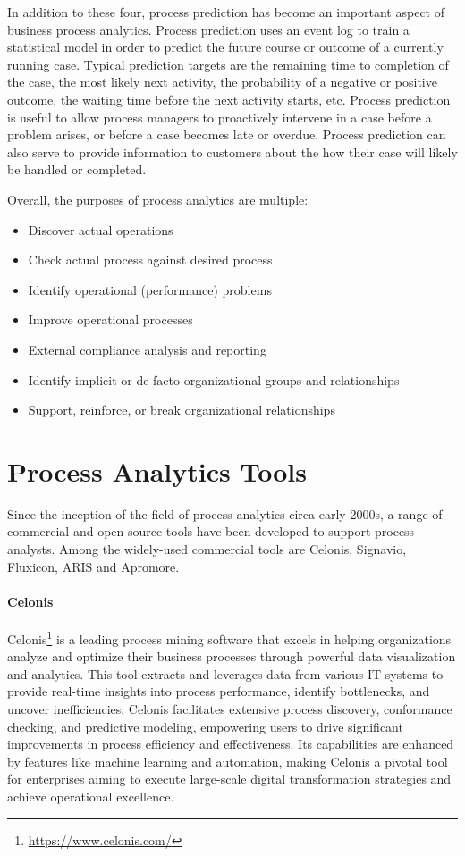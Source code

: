In addition to these four, process prediction has become an important aspect of business process analytics. Process prediction uses an event log to train a statistical model in order to predict the future course or outcome of a currently running case. Typical prediction targets are the remaining time to completion of the case, the most likely next activity, the probability of a negative or positive outcome, the waiting time before the next activity starts, etc. Process prediction is useful to allow process managers to proactively intervene in a case before a problem arises, or before a case becomes late or overdue. Process prediction can also serve to provide information to customers about the how their case will likely be handled or completed.

Overall, the purposes of process analytics are multiple:
\begin{itemize}
   \item Discover actual operations
   \item Check actual process against desired process
   \item Identify operational (performance) problems
   \item Improve operational processes
   \item External compliance analysis and reporting
   \item Identify implicit or de-facto organizational groups and relationships 
   \item Support, reinforce, or break organizational relationships
\end{itemize}

\section{Process Analytics Tools}

Since the inception of the field of process analytics circa early 2000s, a range of commercial and open-source tools have been developed to support process analysts. Among the widely-used commercial tools are Celonis, Signavio, Fluxicon, ARIS and Apromore.

\paragraph*{Celonis}
Celonis\footnote{\url{https://www.celonis.com/}} is a leading process mining software that excels in helping organizations analyze and optimize their business processes through powerful data visualization and analytics. This tool extracts and leverages data from various IT systems to provide real-time insights into process performance, identify bottlenecks, and uncover inefficiencies. Celonis facilitates extensive process discovery, conformance checking, and predictive modeling, empowering users to drive significant improvements in process efficiency and effectiveness. Its capabilities are enhanced by features like machine learning and automation, making Celonis a pivotal tool for enterprises aiming to execute large-scale digital transformation strategies and achieve operational excellence.


